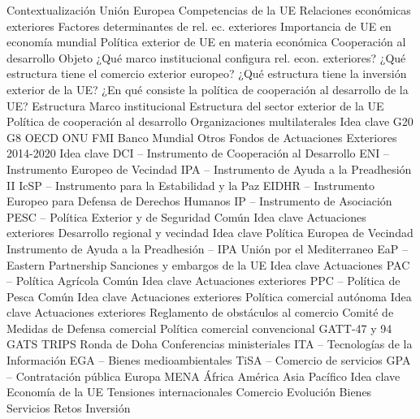 \documentclass{nuevotema}
\begin{document}
\begin{esquema}[enumerate]
	\1[] 
		\2 Contextualización
			\3 Unión Europea
			\3 Competencias de la UE
			\3 Relaciones económicas exteriores
			\3 Factores determinantes de rel. ec. exteriores
			\3 Importancia de UE en economía mundial
			\3 Política exterior de UE en materia económica
			\3 Cooperación al desarrollo
		\2 Objeto
			\3 ¿Qué marco institucional configura rel. econ. exteriores?
			\3 ¿Qué estructura tiene el comercio exterior europeo?
			\3 ¿Qué estructura tiene la inversión exterior de la UE?
			\3 ¿En qué consiste la política de cooperación al desarrollo de la UE?
		\2 Estructura
			\3 Marco institucional
			\3 Estructura del sector exterior de la UE
			\3 Política de cooperación al desarrollo
	\1 
		\2 Organizaciones multilaterales
			\3 Idea clave
			\3 G20
			\3 G8
			\3 OECD
			\3 ONU
			\3 FMI
			\3 Banco Mundial
			\3 Otros
		\2 Fondos de Actuaciones Exteriores 2014-2020
			\3 Idea clave
			\3 DCI -- Instrumento de Cooperación al Desarrollo
			\3 ENI -- Instrumento Europeo de Vecindad
			\3 IPA -- Instrumento de Ayuda a la Preadhesión II
			\3 IcSP -- Instrumento para la Estabilidad y la Paz
			\3 EIDHR -- Instrumento Europeo para Defensa de Derechos Humanos
			\3 IP -- Instrumento de Asociación
		\2 PESC -- Política Exterior y de Seguridad Común
			\3 Idea clave
			\3 Actuaciones exteriores
		\2 Desarrollo regional y vecindad
			\3 Idea clave
			\3 Política Europea de Vecindad
			\3 Instrumento de Ayuda a la Preadhesión -- IPA
			\3 Unión por el Mediterraneo
			\3 EaP -- Eastern Partnership
		\2 Sanciones y embargos de la UE
			\3 Idea clave
			\3 Actuaciones
		\2 PAC -- Política Agrícola Común
			\3 Idea clave
			\3 Actuaciones exteriores
		\2 PPC -- Política de Pesca Común
			\3 Idea clave
			\3 Actuaciones exteriores
		\2 Política comercial autónoma
			\3 Idea clave
			\3 Actuaciones exteriores
			\3 Reglamento de obstáculos al comercio
			\3 Comité de Medidas de Defensa comercial
		\2 Política comercial convencional
			\3 GATT-47 y 94
			\3 GATS
			\3 TRIPS
			\3 Ronda de Doha
			\3 Conferencias ministeriales
			\3 ITA -- Tecnologías de la Información
			\3 EGA -- Bienes medioambientales
			\3 TiSA -- Comercio de servicios
			\3 GPA -- Contratación pública
			\3 Europa
			\3 MENA
			\3 África
			\3 América
			\3 Asia
			\3 Pacífico
	\1 
		\2 Idea clave
			\3 Economía de la UE
			\3 Tensiones internacionales
		\2 Comercio
			\3 Evolución
			\3 Bienes
			\3 Servicios
			\3 Retos
		\2 Inversión

\end{esquema}
\end{document}
